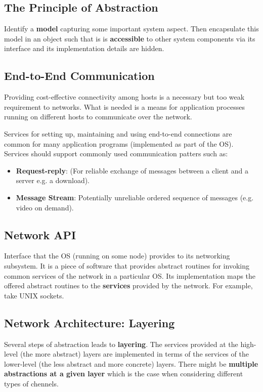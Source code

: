 \documentclass{article}%
\begin{document}
\subsection{The Principle of Abstraction}
\label{sec:orgc94e795}
Identify a \textbf{model} capturing some important system aspect.
Then encapsulate this model in an object such that is is \textbf{accessible} to other system components via its interface and its implementation details are hidden.

\subsection{End-to-End Communication}
\label{sec:orgdffa641}
Providing cost-effective connectivity among hosts is a necessary but too weak requirement to networks.
What is needed is a means for application processes running on different hosts to communicate over the network.

Services for setting up, maintaining and using end-to-end connections are common for many application programs (implemented as part of the OS).
Services should support commonly used communication patters such as:
\begin{itemize}
\item \textbf{Request-reply}: (For reliable exchange of messages between a client and a server e.g. a download).
\item \textbf{Message Stream}: Potentially unreliable ordered sequence of messages (e.g. video on demand).
\end{itemize}

\subsection{Network API}
\label{sec:org3b1104b}
Interface that the OS (running on some node) provides to its networking subsystem.
It is a piece of software that provides abstract routines for invoking common services of the network in a particular OS.
Its implementation maps the offered abstract routines to the \textbf{services} provided by the network.
For example, take UNIX sockets.

\subsection{Network Architecture: Layering}
\label{sec:org7e37983}
Several steps of abstraction leads to \textbf{layering}.
The services provided at the high-level (the more abstract) layers are implemented in terms of the services of the lower-level (the less abstract and more concrete) layers.
There might be \textbf{multiple abstractions at a given layer} which is the case when considering different types of chennels.
\end{document}
